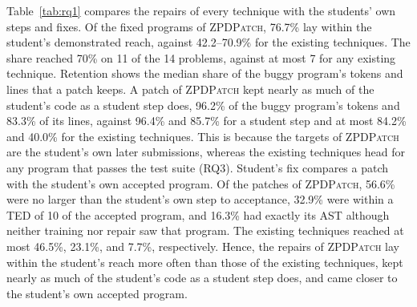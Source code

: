 \documentclass[conference]{IEEEtran}
\begin{document}
Table~\ref{tab:rq1} compares the repairs of every technique with the students' own steps and fixes. Of the fixed programs of \textsc{ZPDPatch}, 76.7\% lay within the student's demonstrated reach, against 42.2--70.9\% for the existing techniques. The share reached 70\% on 11 of the 14 problems, against at most 7 for any existing technique. Retention shows the median share of the buggy program's tokens and lines that a patch keeps. A patch of \textsc{ZPDPatch} kept nearly as much of the student's code as a student step does, 96.2\% of the buggy program's tokens and 83.3\% of its lines, against 96.4\% and 85.7\% for a student step and at most 84.2\% and 40.0\% for the existing techniques. This is because the targets of \textsc{ZPDPatch} are the student's own later submissions, whereas the existing techniques head for any program that passes the test suite (RQ3). Student's fix compares a patch with the student's own accepted program. Of the patches of \textsc{ZPDPatch}, 56.6\% were no larger than the student's own step to acceptance, 32.9\% were within a TED of 10 of the accepted program, and 16.3\% had exactly its AST although neither training nor repair saw that program. The existing techniques reached at most 46.5\%, 23.1\%, and 7.7\%, respectively. Hence, the repairs of \textsc{ZPDPatch} lay within the student's reach more often than those of the existing techniques, kept nearly as much of the student's code as a student step does, and came closer to the student's own accepted program.
\end{document}
